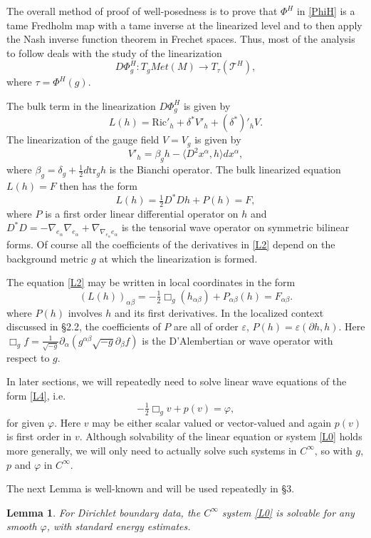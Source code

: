 \documentclass[10pt]{amsart}
\renewcommand{\a}{\alpha}
\renewcommand{\b}{\beta}
\renewcommand{\d}{\delta}
\newcommand{\e}{\varepsilon}
\newcommand{\f}{\varphi}
\newcommand{\cT}{{\mathcal T}}
\newcommand{\Ric}{\mathrm{Ric}}
\newcommand{\be}{\begin{equation}}
\newcommand{\ee}{\end{equation}}
\newcommand{\tr}{\mathrm{tr}}
\newcommand{\p}{\partial}
\renewcommand{\to}{\rightarrow}
\newcommand{\<}{\langle}
\renewcommand{\>}{\rangle}
\theoremstyle{plain}
\newtheorem{lemma}{Lemma}[section]
\theoremstyle{remark}
\theoremstyle{definition}
\numberwithin{equation}{section}
\begin{document}
\medskip 

  The overall method of proof of well-posedness is to prove that $\Phi^H$ in \eqref{PhiH} is a tame Fredholm map with a tame inverse at the 
linearized level and to then apply the Nash inverse function theorem in Frechet spaces. Thus, most of the analysis to follow deals with the 
study of the linearization 
\be \label{DF2}
D\Phi_g^H: T_g Met(M) \to T_{\tau}(\cT^H),
\ee
where $\tau = \Phi^H(g)$. 

\medskip 

  The bulk term in the linearization $D \Phi_g^H$ is given by 
 \be \label{L}
L(h) = \Ric'_h + \d^*V'_h + (\d^*)'_hV.
\ee
The linearization of the gauge field $V = V_g$ is given by 
\be \label{V'h}
V'_h = \b_g h - \<D^2 x^{\a}, h\>dx^{\a},
\ee
where $\b_g = \d_g + \frac{1}{2}d\tr_g h$ is the Bianchi operator. The bulk linearized equation $L(h) = F$ then has the form 
\be \label{L2}
L(h) = \tfrac{1}{2}D^*D h + P(h) = F,
\ee
where $P$ is a first order linear differential operator on $h$ and $D^*D = -\nabla_{e_{\a}}\nabla_{e_{\a}} + \nabla_{\nabla_{e_{\a}} e_{\a}}$ is the tensorial 
wave operator on symmetric bilinear forms. Of course all the coefficients of the derivatives in \eqref{L2} depend on the background metric $g$ at 
which the linearization is formed. 
 
  The equation \eqref{L2} may be written in local coordinates in the form 
 \be \label{L4}
(L(h))_{\a\b} = -\tfrac{1}{2} \Box_g (h_{\a\b}) + P_{\a\b}(h) = F_{\a\b}. 
\ee
where $P(h)$ involves $h$ and its first derivatives. In the localized context discussed in \S 2.2, the coefficients of $P$ are 
all of order $\e$, $P(h) = \e(\p h, h)$. Here $\Box_g f = \frac{1}{\sqrt{-g}}\p_{\a}(g^{\a\b}\sqrt{-g}\p_{\b}f)$ is the D'Alembertian or 
wave operator with respect to $g$. 

\medskip 

  In later sections, we will repeatedly need to solve linear wave equations of the form \eqref{L4}, i.e. 
\be \label{L0}
-\tfrac{1}{2}\Box_g v + p(v)  = \f,
\ee
for given $\f$. Here $v$ may be either scalar valued or vector-valued and again $p(v)$ is first order in $v$. Although solvability of the linear 
equation or system \eqref{L0} holds more generally, we will only need to actually solve such systems in $C^{\infty}$, so with $g$, $p$ and 
$\f$ in $C^{\infty}$. 

 The next Lemma is well-known and will be used repeatedly in \S 3. 

\begin{lemma} \label{Dir222}
For Dirichlet boundary data, the $C^{\infty}$ system \eqref{L0} is solvable for any smooth $\f$, with standard energy estimates. 
\end{lemma}
\end{document}
